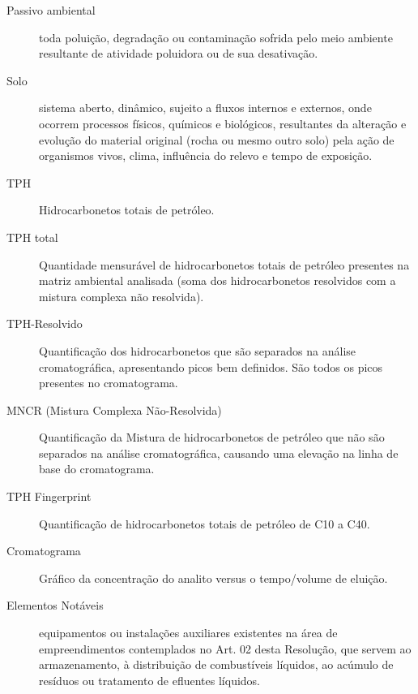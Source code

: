 \begin{description}
	\item[Passivo ambiental] toda poluição, degradação ou 
	contaminação sofrida pelo meio ambiente resultante de 
	atividade poluidora ou de sua desativação.
	
	\item[Solo] sistema aberto, dinâmico, sujeito a fluxos 
	internos e externos, onde ocorrem processos físicos, 
	químicos e biológicos, resultantes da alteração e 
	evolução do material original (rocha ou mesmo outro 
	solo) pela ação de organismos vivos, clima, influência 
	do relevo e tempo de exposição.
	
	\item[TPH] Hidrocarbonetos totais de petróleo.
	
	\item[TPH total] Quantidade mensurável de 
	hidrocarbonetos totais de petróleo presentes na matriz 
	ambiental analisada (soma dos hidrocarbonetos 
	resolvidos com a mistura complexa não resolvida).
	
	\item[TPH-Resolvido] Quantificação dos hidrocarbonetos 
	que são separados na análise cromatográfica, 
	apresentando picos bem definidos. São todos os picos 
	presentes no cromatograma.
	
	\item[MNCR (Mistura Complexa Não-Resolvida)] 
	Quantificação da Mistura de hidrocarbonetos de petróleo 
	que não são separados na análise cromatográfica, 
	causando uma elevação na linha de base do cromatograma.
	
	\item[TPH Fingerprint] Quantificação de hidrocarbonetos 
	totais de petróleo de C10 a C40.
	
	\item[Cromatograma] Gráfico da concentração do analito 
	versus o tempo/volume de eluição.
	
	\item[Elementos Notáveis] equipamentos ou instalações 
	auxiliares existentes na área de empreendimentos 
	contemplados no Art. 02 desta Resolução, que servem ao 
	armazenamento, à distribuição de combustíveis líquidos, 
	ao acúmulo de resíduos ou tratamento de efluentes 
	líquidos.
\end{description}